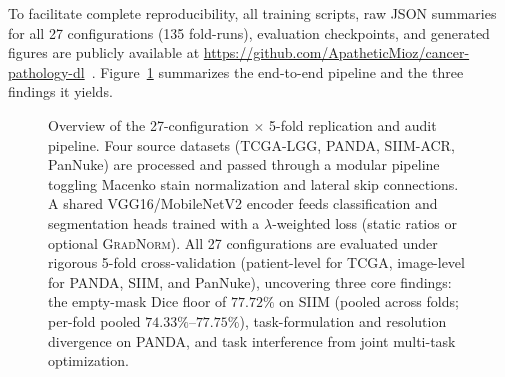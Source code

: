 \documentclass[preprint,12pt]{elsarticle}
\begin{document}
To facilitate complete reproducibility, all training scripts, raw JSON summaries for all 27 configurations (135 fold-runs), evaluation checkpoints, and generated figures are publicly available at \url{https://github.com/ApatheticMioz/cancer-pathology-dl}~\cite{ali2026cancerpathologydl}. Figure~\ref{fig:pipeline} summarizes the end-to-end pipeline and the three findings it yields.

\begin{figure}[t]
\centering
{}
\caption{Overview of the 27-configuration $\times$ 5-fold replication and audit pipeline. Four source datasets (TCGA-LGG, PANDA, SIIM-ACR, PanNuke) are processed and passed through a modular pipeline toggling Macenko stain normalization and lateral skip connections. A shared VGG16/MobileNetV2 encoder feeds classification and segmentation heads trained with a $\lambda$-weighted loss (static ratios or optional \textsc{GradNorm}). All 27 configurations are evaluated under rigorous 5-fold cross-validation (patient-level for TCGA, image-level for PANDA, SIIM, and PanNuke), uncovering three core findings: the empty-mask Dice floor of $77.72\%$ on SIIM (pooled across folds; per-fold pooled $74.33\%$--$77.75\%$), task-formulation and resolution divergence on PANDA, and task interference from joint multi-task optimization.}
\label{fig:pipeline}
\end{figure}
\end{document}
